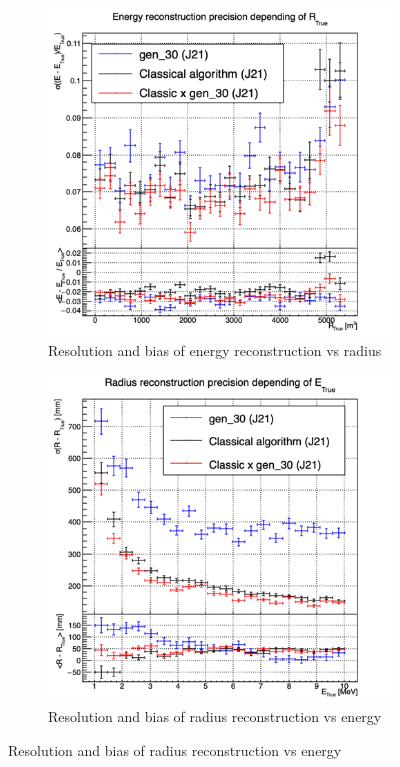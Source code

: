 \documentclass[../main.tex]{subfiles}
\begin{document}
\begin{figure}[ht]
\begin{subfigure}[t]{0.32\linewidth}
    \includegraphics[width=\linewidth]{images/jcnn/vic_cnn/multi_vic_cnn_Cx30_MESBvRTC.png}
    \caption{Resolution and bias of energy reconstruction vs radius}
    \label{fig:jcnn:vic_cnn:multi_vic_cnn_Cx30_MESBvRTC}
  \end{subfigure}
  \begin{subfigure}[t]{0.32\linewidth}
    \centering
    \includegraphics[width=\linewidth]{images/jcnn/vic_cnn/multi_vic_cnn_Cx30_MSBvETC.png}
    \caption{Resolution and bias of radius reconstruction vs energy}
    \label{fig:jcnn:vic_cnn:multi_vic_cnn_Cx30_MSBvETC}
  \end{subfigure}



\end{figure}
\end{document}
